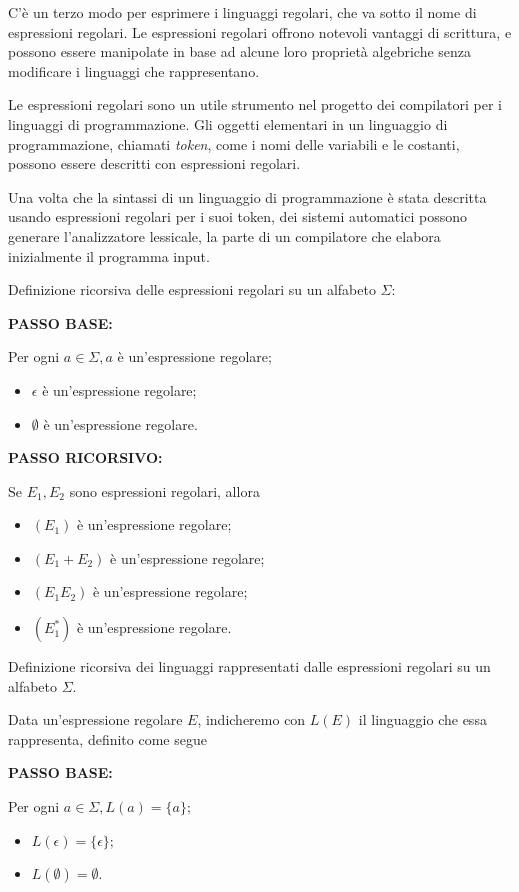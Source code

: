 C'è un terzo modo per esprimere i linguaggi regolari, che va sotto
il nome di espressioni regolari. Le espressioni regolari offrono
notevoli vantaggi di scrittura, e possono essere manipolate in base
ad alcune loro proprietà algebriche senza modificare i linguaggi che
rappresentano.


Le espressioni regolari sono un utile strumento nel progetto dei
compilatori per i linguaggi di programmazione. Gli oggetti
elementari in un linguaggio di programmazione, chiamati \textit{token},
come i nomi delle variabili e le costanti, possono essere descritti
con espressioni regolari.

Una volta che la sintassi di un linguaggio di programmazione è
stata descritta usando espressioni regolari per i suoi token, dei
sistemi automatici possono generare l'analizzatore lessicale, la parte
di un compilatore che elabora inizialmente il programma input.

Definizione ricorsiva delle espressioni regolari su un alfabeto $\Sigma:$

\textbf{PASSO BASE:}

Per ogni $a \in \Sigma, a$ è un'espressione regolare;
\begin{itemize}
    \item $\epsilon$ è un'espressione regolare;
    \item $\emptyset$ è un'espressione regolare.
\end{itemize}

\textbf{PASSO RICORSIVO:} 

Se $E_{1}, E_{2}$ sono espressioni regolari, allora
\begin{itemize}
    \item $\left(E_{1}\right)$ è un'espressione regolare;
    \item $\left(E_{1}+E_{2}\right)$ è un'espressione regolare;
    \item $\left(E_{1} E_{2}\right)$ è un'espressione regolare;
    \item $\left(E_{1}^{*}\right)$ è un'espressione regolare.
\end{itemize}

Definizione ricorsiva dei linguaggi rappresentati dalle espressioni regolari su un alfabeto $\Sigma$.

Data un'espressione regolare $E$, indicheremo con $L(E)$ il linguaggio che essa rappresenta, definito come segue

\textbf{PASSO BASE:}

Per ogni $a \in \Sigma, L(a)=\{a\} ;$
\begin{itemize}
    \item $L(\epsilon)=\{\epsilon\} ;$
    \item $L(\emptyset)=\emptyset$.
\end{itemize}


